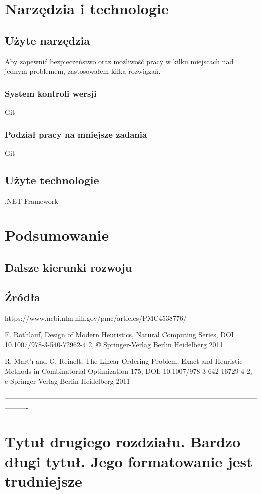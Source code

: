 \documentclass[twoside]{projektInzynierskiMS1}
\newcommand{\si}{ś}
\begin{document}
\section{Narzędzia i technologie}
	\subsection{Użyte narzędzia}
	Aby zapewnić bezpieczeństwo oraz możliwo\si ć pracy w kilku miejscach nad jednym problemem, zastosowałem kilka rozwiązań.
	\subsubsection{System kontroli wersji}
	Git
	\subsubsection{Podział pracy na mniejsze zadania}
	Git
	\subsection{Użyte technologie}
	.NET Framework
\section{Podsumowanie}
	\subsection{Dalsze kierunki rozwoju}
	\subsection{Źródła}
https://www.ncbi.nlm.nih.gov/pmc/articles/PMC4538776/

F. Rothlauf, Design of Modern Heuristics, Natural Computing Series,
DOI 10.1007/978-3-540-72962-4 2, © Springer-Verlag Berlin Heidelberg 2011

R. Mart'ı and G. Reinelt, The Linear Ordering Problem, Exact and Heuristic Methods
in Combinatorial Optimization 175, DOI: 10.1007/978-3-642-16729-4 2,
c Springer-Verlag Berlin Heidelberg 2011


----------------------------------------------------------------------------------------------------------------------
\section[Tytuł drugiego rozdziału. Bardzo długi \ldots]
        {Tytuł drugiego rozdziału. \newlineTekst Bardzo długi tytuł. \newlineTekst
          Jego \newlineSpis formatowanie jest trudniejsze}
\end{document}
